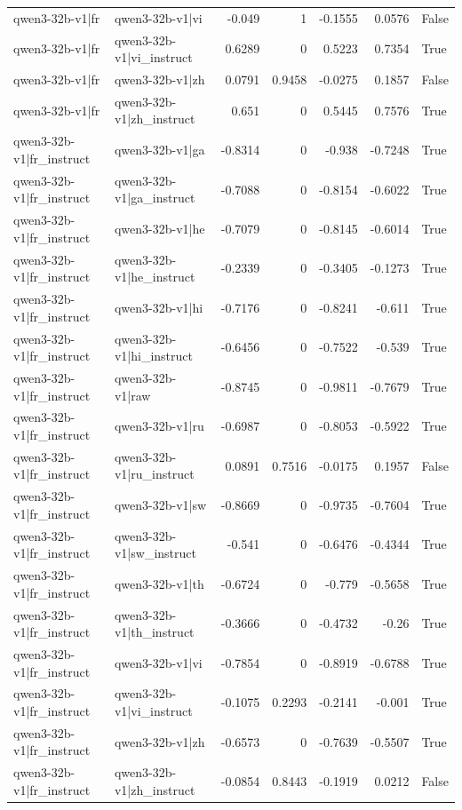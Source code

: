 \begin{table}
\begin{tabular}{l l r r r r l}
qwen3-32b-v1|fr & qwen3-32b-v1|vi & -0.049 & 1 & -0.1555 & 0.0576 & False \\
qwen3-32b-v1|fr & qwen3-32b-v1|vi_instruct & 0.6289 & 0 & 0.5223 & 0.7354 & True \\
qwen3-32b-v1|fr & qwen3-32b-v1|zh & 0.0791 & 0.9458 & -0.0275 & 0.1857 & False \\
qwen3-32b-v1|fr & qwen3-32b-v1|zh_instruct & 0.651 & 0 & 0.5445 & 0.7576 & True \\
qwen3-32b-v1|fr_instruct & qwen3-32b-v1|ga & -0.8314 & 0 & -0.938 & -0.7248 & True \\
qwen3-32b-v1|fr_instruct & qwen3-32b-v1|ga_instruct & -0.7088 & 0 & -0.8154 & -0.6022 & True \\
qwen3-32b-v1|fr_instruct & qwen3-32b-v1|he & -0.7079 & 0 & -0.8145 & -0.6014 & True \\
qwen3-32b-v1|fr_instruct & qwen3-32b-v1|he_instruct & -0.2339 & 0 & -0.3405 & -0.1273 & True \\
qwen3-32b-v1|fr_instruct & qwen3-32b-v1|hi & -0.7176 & 0 & -0.8241 & -0.611 & True \\
qwen3-32b-v1|fr_instruct & qwen3-32b-v1|hi_instruct & -0.6456 & 0 & -0.7522 & -0.539 & True \\
qwen3-32b-v1|fr_instruct & qwen3-32b-v1|raw & -0.8745 & 0 & -0.9811 & -0.7679 & True \\
qwen3-32b-v1|fr_instruct & qwen3-32b-v1|ru & -0.6987 & 0 & -0.8053 & -0.5922 & True \\
qwen3-32b-v1|fr_instruct & qwen3-32b-v1|ru_instruct & 0.0891 & 0.7516 & -0.0175 & 0.1957 & False \\
qwen3-32b-v1|fr_instruct & qwen3-32b-v1|sw & -0.8669 & 0 & -0.9735 & -0.7604 & True \\
qwen3-32b-v1|fr_instruct & qwen3-32b-v1|sw_instruct & -0.541 & 0 & -0.6476 & -0.4344 & True \\
qwen3-32b-v1|fr_instruct & qwen3-32b-v1|th & -0.6724 & 0 & -0.779 & -0.5658 & True \\
qwen3-32b-v1|fr_instruct & qwen3-32b-v1|th_instruct & -0.3666 & 0 & -0.4732 & -0.26 & True \\
qwen3-32b-v1|fr_instruct & qwen3-32b-v1|vi & -0.7854 & 0 & -0.8919 & -0.6788 & True \\
qwen3-32b-v1|fr_instruct & qwen3-32b-v1|vi_instruct & -0.1075 & 0.2293 & -0.2141 & -0.001 & True \\
qwen3-32b-v1|fr_instruct & qwen3-32b-v1|zh & -0.6573 & 0 & -0.7639 & -0.5507 & True \\
qwen3-32b-v1|fr_instruct & qwen3-32b-v1|zh_instruct & -0.0854 & 0.8443 & -0.1919 & 0.0212 & False \\

\end{tabular}
\end{table}
